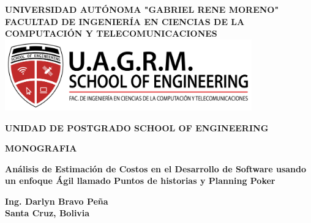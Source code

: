 \begin{titlepage}
    \begin{center}
        {\fontsize{18pt}{10pt}\selectfont\textbf{UNIVERSIDAD AUTÓNOMA "GABRIEL RENE MORENO"}} \\
        {\fontsize{18pt}{10pt}\selectfont\textbf{FACULTAD DE INGENIERÍA EN CIENCIAS DE LA COMPUTACIÓN Y TELECOMUNICACIONES}} \\
        \includegraphics[width=0.8\textwidth]{images/logo_soe.png} \\
        \vspace{1cm}

        \vspace{2cm}
        {\fontsize{18pt}{5pt}\selectfont\textbf{UNIDAD DE POSTGRADO SCHOOL OF ENGINEERING}} \\
        \vspace{0.5cm}
        
        \vspace{0.5cm}
        {\fontsize{20pt}{5pt}\selectfont\textbf{MONOGRAFIA}} \\
        \vspace{1cm}
        
        {\fontsize{16pt}{5pt}\selectfont\textbf{Análisis de Estimación de Costos en el Desarrollo de Software usando un enfoque Ágil llamado Puntos de historias y Planning Poker}} \\
        \vspace{1cm}
        
        \vspace{2cm}
        {\fontsize{14pt}{22pt}\selectfont\textbf{Ing. Darlyn Bravo Peña}} \\
        
        \vfill
        \textbf{Santa Cruz, Bolivia} \\
    \end{center}
    \end{titlepage}
    
